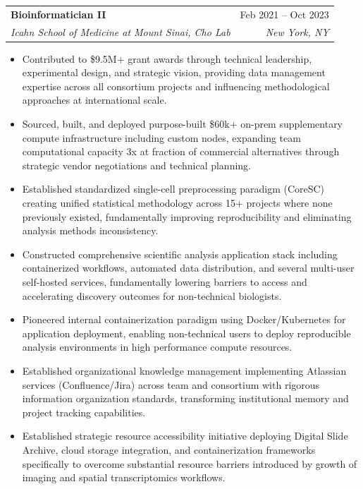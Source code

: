 \documentclass[letterpaper,11pt]{article}
\makeatletter
\newcommand{\resumeItem}[1]{
  \item\small{
    {#1 \vspace{-2pt}}
  }
}
\newcommand{\resumeSubheading}[4]{
  \vspace{-2pt}\item
    \begin{tabular*}{0.97\textwidth}[t]{l@{\extracolsep{\fill}}r}
      \textbf{#1} & #2 \\
      \textit{\small#3} & \textit{\small #4} \\
    \end{tabular*}\vspace{-7pt}
}
\newcommand{\resumeItemListStart}{\begin{itemize}}
\newcommand{\resumeItemListEnd}{\end{itemize}\vspace{-5pt}}
\makeatother
\begin{document}
    \resumeSubheading
      {Bioinformatician II}{Feb 2021 -- Oct 2023}
      {Icahn School of Medicine at Mount Sinai, Cho Lab}{New York, NY}
      \resumeItemListStart
        \resumeItem{Contributed to \$9.5M+ grant awards through technical leadership, experimental design, and strategic vision, providing data management expertise across all consortium projects and influencing methodological approaches at international scale.}
        \resumeItem{Sourced, built, and deployed purpose-built \$60k+ on-prem supplementary compute infrastructure including custom nodes, expanding team computational capacity 3x at fraction of commercial alternatives through strategic vendor negotiations and technical planning.}
        \resumeItem{Established standardized single-cell preprocessing paradigm (CoreSC) creating unified statistical methodology across 15+ projects where none previously existed, fundamentally improving reproducibility and eliminating analysis methods inconsistency.}
        \resumeItem{Constructed comprehensive scientific analysis application stack including containerized workflows, automated data distribution, and several multi-user self-hosted services, fundamentally lowering barriers to access and accelerating discovery outcomes for non-technical biologists.}
        \resumeItem{Pioneered internal containerization paradigm using Docker/Kubernetes for application deployment, enabling non-technical users to deploy reproducible analysis environments in high performance compute resources.}
        \resumeItem{Established organizational knowledge management implementing Atlassian services (Confluence/Jira) across team and consortium with rigorous information organization standards, transforming institutional memory and project tracking capabilities.}
        \resumeItem{Established strategic resource accessibility initiative deploying Digital Slide Archive, cloud storage integration, and containerization frameworks specifically to overcome substantial resource barriers introduced by growth of imaging and spatial transcriptomics workflows.}
      \resumeItemListEnd
\end{document}
